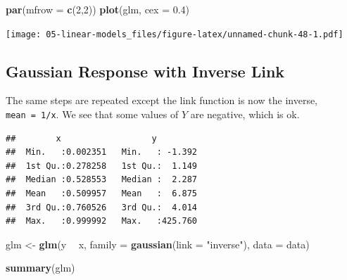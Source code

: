 \documentclass[openany]{book}
\newenvironment{Shaded}{\begin{snugshade}}{\end{snugshade}}
\newcommand{\ControlFlowTok}[1]{\textcolor[rgb]{0.13,0.29,0.53}{\textbf{#1}}}
\newcommand{\DataTypeTok}[1]{\textcolor[rgb]{0.13,0.29,0.53}{#1}}
\newcommand{\DecValTok}[1]{\textcolor[rgb]{0.00,0.00,0.81}{#1}}
\newcommand{\FloatTok}[1]{\textcolor[rgb]{0.00,0.00,0.81}{#1}}
\newcommand{\KeywordTok}[1]{\textcolor[rgb]{0.13,0.29,0.53}{\textbf{#1}}}
\newcommand{\NormalTok}[1]{#1}
\newcommand{\OperatorTok}[1]{\textcolor[rgb]{0.81,0.36,0.00}{\textbf{#1}}}
\newcommand{\StringTok}[1]{\textcolor[rgb]{0.31,0.60,0.02}{#1}}
\begin{document}
\begin{Shaded}
\begin{Highlighting}[]
\KeywordTok{par}\NormalTok{(}\DataTypeTok{mfrow =} \KeywordTok{c}\NormalTok{(}\DecValTok{2}\NormalTok{,}\DecValTok{2}\NormalTok{))}
\KeywordTok{plot}\NormalTok{(glm, }\DataTypeTok{cex =} \FloatTok{0.4}\NormalTok{)}
\end{Highlighting}
\end{Shaded}

\texttt{[image: 05-linear-models\_files/figure-latex/unnamed-chunk-48-1.pdf]}

\hypertarget{gaussian-response-with-inverse-link}{%
\subsection{Gaussian Response with Inverse Link}\label{gaussian-response-with-inverse-link}}

The same steps are repeated except the link function is now the inverse, \texttt{mean\ =\ 1/x}. We see that some values of \(Y\) are negative, which is ok.

\begin{Shaded}
\end{Shaded}

\begin{verbatim}
##        x                  y          
##  Min.   :0.002351   Min.   : -1.392  
##  1st Qu.:0.278258   1st Qu.:  1.149  
##  Median :0.528553   Median :  2.287  
##  Mean   :0.509957   Mean   :  6.875  
##  3rd Qu.:0.760526   3rd Qu.:  4.014  
##  Max.   :0.999992   Max.   :425.760
\end{verbatim}

\begin{Shaded}
\begin{Highlighting}[]
\NormalTok{glm <-}\StringTok{ }\KeywordTok{glm}\NormalTok{(y }\OperatorTok{~}\StringTok{ }\NormalTok{x, }\DataTypeTok{family =} \KeywordTok{gaussian}\NormalTok{(}\DataTypeTok{link =} \StringTok{"inverse"}\NormalTok{), }\DataTypeTok{data =}\NormalTok{ data)}

\KeywordTok{summary}\NormalTok{(glm)}
\end{Highlighting}
\end{Shaded}
\end{document}
